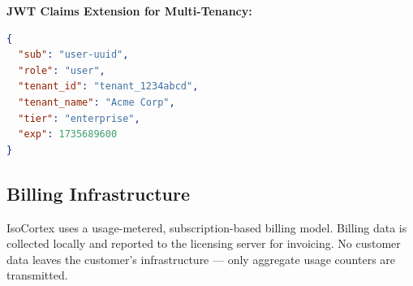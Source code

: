 \documentclass[11pt,a4paper]{article}
\begin{document}
\textbf{JWT Claims Extension for Multi-Tenancy:}
\begin{lstlisting}[language=JSON]
{
  "sub": "user-uuid",
  "role": "user",
  "tenant_id": "tenant_1234abcd",
  "tenant_name": "Acme Corp",
  "tier": "enterprise",
  "exp": 1735689600
}
\end{lstlisting}

\subsection{Billing Infrastructure}

IsoCortex uses a usage-metered, subscription-based billing model. Billing data is collected locally and reported to the licensing server for invoicing. No customer data leaves the customer's infrastructure --- only aggregate usage counters are transmitted.
\end{document}
